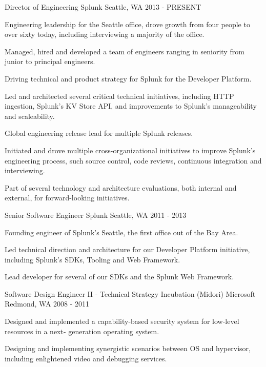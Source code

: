 \begin{cventries}
  \cventry
    {Director of Engineering}
    {Splunk}
    {Seattle, WA}
    {2013 - PRESENT}
    {
      \begin{cvitems}
        \item {Engineering leadership for the Seattle office, drove growth from four people to over sixty today, including interviewing a majority of the office.}
        \item {Managed, hired and developed a team of engineers ranging in seniority from junior to principal engineers.}
        \item {Driving technical and product strategy for Splunk for the Developer Platform.}
        \item {Led and architected several critical technical initiatives, including HTTP ingestion, Splunk's KV Store API, and improvements to Splunk's manageability and scaleability.}
        \item {Global engineering release lead for multiple Splunk releases.}
        \item {Initiated and drove multiple cross-organizational initiatives to improve Splunk's engineering process, such source control, code reviews, continuous integration and interviewing.}
        \item {Part of several technology and architecture evaluations, both internal and external, for forward-looking initiatives.}
      \end{cvitems}
    }
  \cventry
    {Senior Software Engineer}
    {Splunk}
    {Seattle, WA}
    {2011 - 2013}
    {
      \begin{cvitems}
		\item {Founding engineer of Splunk's Seattle, the first office out of the Bay Area.}
		\item {Led technical direction and architecture for our Developer Platform initiative, including Splunk's SDKs, Tooling and Web Framework.}
		\item {Lead developer for several of our SDKs and the Splunk Web Framework.}
      \end{cvitems}
    }
  \cventry
    {Software Design Engineer II - Technical Strategy Incubation (Midori)}
    {Microsoft}
    {Redmond, WA}
    {2008 - 2011}
    {
      \begin{cvitems}
        \item {Designed and implemented a capability-based security system for low-level resources in a next- generation operating system.}
        \item {Designing and implementing synergistic scenarios between OS and hypervisor, including enlightened video and debugging services.}

\end{cvitems}}
\end{cventries}
